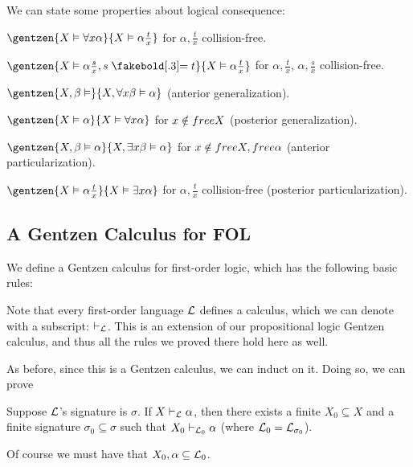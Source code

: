 We can state some properties about logical consequence:
\benum
    \item $\gentzen{X\vDash\forall x\alpha}{X\vDash\alpha\frac tx}$ for $\alpha,\frac tx$ collision-free.
    \item $\gentzen{X\vDash\alpha\frac sx,s\eq t}{X\vDash\alpha\frac tx}$ for $\alpha,\frac tx$, $\alpha,\frac sx$ collision-free.
    \item $\gentzen{X,\beta\vDash}{X,\forall x\beta\vDash\alpha}$ (anterior generalization).
    \item $\gentzen{X\vDash\alpha}{X\vDash\forall x\alpha}$ for $x\notin{\sl free} X$ (posterior generalization).
    \item $\gentzen{X,\beta\vDash\alpha}{X,\exists x\beta\vDash\alpha}$ for $x\notin{\sl free} X,{\sl free}\alpha$ (anterior particularization).
    \item $\gentzen{X\vDash\alpha\frac tx}{X\vDash\exists x\alpha}$ for $\alpha,\frac tx$ collision-free (posterior particularization).
\eenum

\subsection{A Gentzen Calculus for FOL}

We define a Gentzen calculus for first-order logic, which has the following basic rules:

\centerline{\vbox{\jot
{}}}

Note that every first-order language ${\cal L}$ defines a calculus, which we can denote with a subscript: $\vdash_{{\cal L}}$.
This is an extension of our propositional logic Gentzen calculus, and thus all the rules we proved there hold here as well.

As before, since this is a Gentzen calculus, we can induct on it.
Doing so, we can prove

\bprop

    Suppose ${\cal L}$'s signature is $\sigma$.
    If $X\vdash_{{\cal L}}\alpha$, then there exists a finite $X_0\subseteq X$ and a finite signature $\sigma_0\subseteq\sigma$ such that $X_0\vdash_{{\cal L}_0}\alpha$ (where ${\cal L}_0={\cal L}_{\sigma_0}$).

\eprop

Of course we must have that $X_0,\alpha\subseteq{\cal L}_0$.

